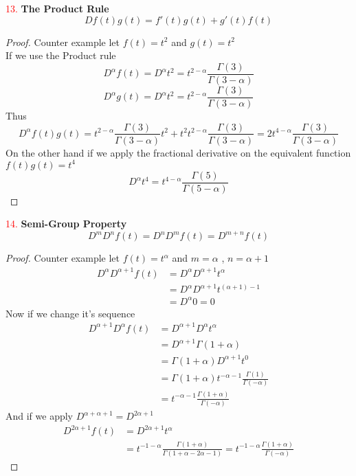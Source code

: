 \newpage

\textcolor{red}{13.}\textbf{ The Product Rule }
\[
    Df(t)g(t) = f'(t)g(t)+g'(t)f(t)
\]
\begin{proof}[Proof]
    Counter example let $f(t)=t^2$ and $g(t) = t^2$ 
    \\
    If we use the Product rule
    \[
        D^\alpha f(t) = D^\alpha t^2 = t^{2-\alpha}\frac{\Gamma{(3)} } {\Gamma{(3-\alpha)} }   
    \]  
    \[
        D^\alpha g(t) = D^\alpha t^2 = t^{2-\alpha}\frac{\Gamma{(3)} } {\Gamma{(3-\alpha)} }   
    \]
    Thus
    \[
        D^\alpha f(t)g(t) = t^{2-\alpha}\frac{\Gamma{(3)} } {\Gamma{(3-\alpha)} }  t^2 +  t^2 t^{2-\alpha}\frac{\Gamma{(3)} } {\Gamma{(3-\alpha)} } 
        = 2 t^{4-\alpha}\frac{\Gamma{(3)} } {\Gamma{(3-\alpha)} }
    \]
    On the other hand if we apply the fractional derivative on the equivalent function $f(t)g(t) = t^4$
    \[
        D^\alpha t^4 = t^{4-\alpha}\frac{\Gamma{(5)} } {\Gamma{(5-\alpha)} }   
    \]  
\end{proof}
\textcolor{red}{14.}\textbf{ Semi-Group Property}
\[
    D^m D^n f(t) = D^n D^m f(t) =  D^{m+n} f(t)
\]
\begin{proof}[Proof]
    Counter example let $f(t)=t^\alpha$ and $m=\alpha$ , $n=\alpha+1$
    \begin{align*}
        D^{\alpha}D^{\alpha+1} f(t) &= D^{\alpha}D^{\alpha+1} t^\alpha 
        \\
        &= D^{\alpha} D^{\alpha+1} t^{(\alpha+1)-1} 
        \\
        &= D^{\alpha} 0 = 0
    \end{align*}
    Now if we change it's sequence
    \begin{align*}
        D^{\alpha+1}D^{\alpha} f(t) &= D^{\alpha+1}D^{\alpha} t^{\alpha} 
        \\
        &= D^{\alpha+1} \Gamma(1+\alpha) 
        \\
        &= \Gamma(1+\alpha) D^{\alpha+1} t^0 
        \\
        &= \Gamma(1+\alpha) t^{-\alpha-1}\frac{\Gamma{(1)} } {\Gamma{(-\alpha)} }
        \\
        &= t^{-\alpha-1}\frac{\Gamma(1+\alpha)} {\Gamma{(-\alpha)} }
    \end{align*}
    And if we apply $D^{\alpha+\alpha+1} = D^{2\alpha+1}$
    \begin{align*}
        D^{2\alpha+1} f(t) &= D^{2\alpha+1} t^{\alpha} 
        \\
        &= t^{-1-\alpha}\frac{\Gamma{(1+\alpha)}}{\Gamma{(1+\alpha-2\alpha-1)}} = t^{-1-\alpha}\frac{\Gamma{(1+\alpha)}}{\Gamma{(-\alpha)}}
    \end{align*}
\end{proof}
\newpage
